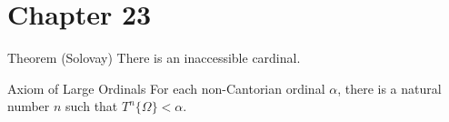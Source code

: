\section *{Chapter 23}

\begin{Thm}{Theorem (Solovay)}
 There is an inaccessible cardinal.
\end{Thm}

\begin{axiom}{Axiom of Large Ordinals}
 For each non-Cantorian ordinal
 $\alpha$, there is a natural number $n$ such that
 $T^n\{\Omega\} < \alpha$.
\end{axiom}
